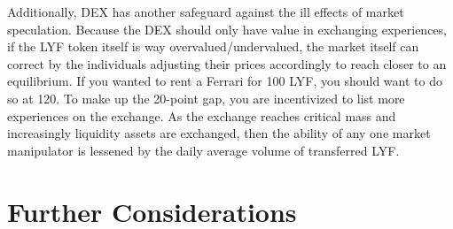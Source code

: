 \documentclass[11pt]{article}
\begin{document}
Additionally, DEX has another safeguard against the ill effects of market speculation. Because the DEX should only have value in exchanging experiences, if the LYF token itself is way overvalued/undervalued, the market itself can correct by the individuals adjusting their prices accordingly to reach closer to an equilibrium. If you wanted to rent a Ferrari for 100 LYF, you should want to do so at 120. To make up the 20-point gap, you are incentivized to list more experiences on the exchange. As the exchange reaches critical mass and increasingly liquidity assets are exchanged, then the ability of any one market manipulator is lessened by the daily average volume of transferred LYF. 

\section{Further Considerations}
\label{sec-5}
\end{document}

